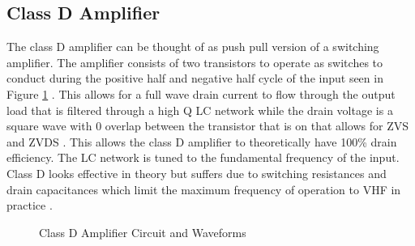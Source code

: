 \subsection{Class D Amplifier}

The class D amplifier can be thought of as push pull version of a switching amplifier. The amplifier consists of two transistors to operate as switches to conduct during the positive half and negative half cycle of the input seen in Figure \ref{fig:class_d} \cite{C.Cripps2006}. This allows for a full wave drain current to flow through the output load that is filtered through a high Q LC network while the drain voltage is a square wave with 0 overlap between the transistor that is on that allows for ZVS and ZVDS \cite{Rosu2001}. This allows the class D amplifier to theoretically have 100\% drain efficiency. The LC network is tuned to the fundamental frequency of the input. Class D looks effective in theory but suffers due to switching resistances and drain capacitances which limit the maximum frequency of operation to VHF in practice \cite{Raab2003}.

\begin{figure}
    \caption{Class D Amplifier Circuit and Waveforms\cite{C.Cripps2006}}\label{fig:class_d}
\end{figure}


